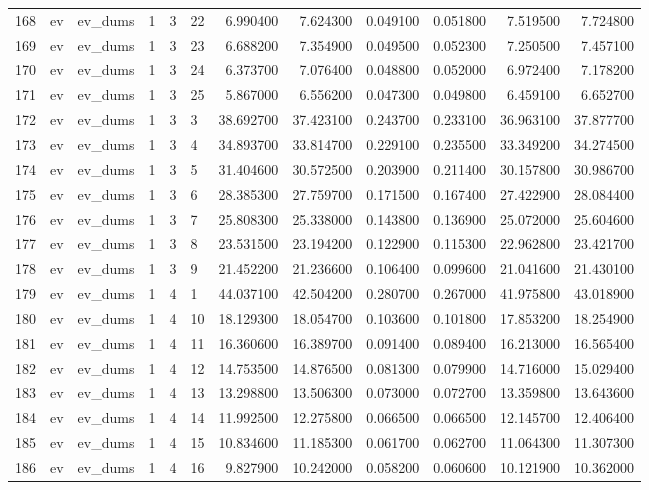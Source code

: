 \begin{tabular}{llllllrrrrrr}
168 & ev & ev_dums & 1 & 3 & 22 & 6.990400 & 7.624300 & 0.049100 & 0.051800 & 7.519500 & 7.724800 \\
169 & ev & ev_dums & 1 & 3 & 23 & 6.688200 & 7.354900 & 0.049500 & 0.052300 & 7.250500 & 7.457100 \\
170 & ev & ev_dums & 1 & 3 & 24 & 6.373700 & 7.076400 & 0.048800 & 0.052000 & 6.972400 & 7.178200 \\
171 & ev & ev_dums & 1 & 3 & 25 & 5.867000 & 6.556200 & 0.047300 & 0.049800 & 6.459100 & 6.652700 \\
172 & ev & ev_dums & 1 & 3 & 3 & 38.692700 & 37.423100 & 0.243700 & 0.233100 & 36.963100 & 37.877700 \\
173 & ev & ev_dums & 1 & 3 & 4 & 34.893700 & 33.814700 & 0.229100 & 0.235500 & 33.349200 & 34.274500 \\
174 & ev & ev_dums & 1 & 3 & 5 & 31.404600 & 30.572500 & 0.203900 & 0.211400 & 30.157800 & 30.986700 \\
175 & ev & ev_dums & 1 & 3 & 6 & 28.385300 & 27.759700 & 0.171500 & 0.167400 & 27.422900 & 28.084400 \\
176 & ev & ev_dums & 1 & 3 & 7 & 25.808300 & 25.338000 & 0.143800 & 0.136900 & 25.072000 & 25.604600 \\
177 & ev & ev_dums & 1 & 3 & 8 & 23.531500 & 23.194200 & 0.122900 & 0.115300 & 22.962800 & 23.421700 \\
178 & ev & ev_dums & 1 & 3 & 9 & 21.452200 & 21.236600 & 0.106400 & 0.099600 & 21.041600 & 21.430100 \\
179 & ev & ev_dums & 1 & 4 & 1 & 44.037100 & 42.504200 & 0.280700 & 0.267000 & 41.975800 & 43.018900 \\
180 & ev & ev_dums & 1 & 4 & 10 & 18.129300 & 18.054700 & 0.103600 & 0.101800 & 17.853200 & 18.254900 \\
181 & ev & ev_dums & 1 & 4 & 11 & 16.360600 & 16.389700 & 0.091400 & 0.089400 & 16.213000 & 16.565400 \\
182 & ev & ev_dums & 1 & 4 & 12 & 14.753500 & 14.876500 & 0.081300 & 0.079900 & 14.716000 & 15.029400 \\
183 & ev & ev_dums & 1 & 4 & 13 & 13.298800 & 13.506300 & 0.073000 & 0.072700 & 13.359800 & 13.643600 \\
184 & ev & ev_dums & 1 & 4 & 14 & 11.992500 & 12.275800 & 0.066500 & 0.066500 & 12.145700 & 12.406400 \\
185 & ev & ev_dums & 1 & 4 & 15 & 10.834600 & 11.185300 & 0.061700 & 0.062700 & 11.064300 & 11.307300 \\
186 & ev & ev_dums & 1 & 4 & 16 & 9.827900 & 10.242000 & 0.058200 & 0.060600 & 10.121900 & 10.362000 \\

\end{tabular}

